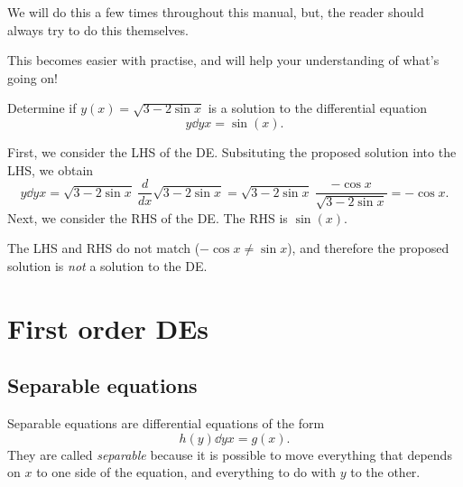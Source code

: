 \documentclass{book}
\begin{document}
We will do this a few times throughout this manual, but, the reader
should always try to do this themselves.

This becomes easier with practise, and will help your understanding of
what's going on!

\begin{example*}
  Determine if $y(x) = \sqrt{3-2\sin x}$ is a solution to the
  differential equation
  \begin{dmath*}
    y \dd{y}{x} = \sin(x).
  \end{dmath*}
\end{example*}

\begin{solution}
  First, we consider the LHS of the DE.  Subsituting the proposed
  solution into the LHS, we obtain
  \begin{dmath*}
    y \dd{y}{x} = \sqrt{3-2\sin x}\ \frac{d}{dx} \sqrt{3-2\sin x}
                = \sqrt{3-2\sin x}\ \frac{-\cos x}{\sqrt{3-2\sin x}}
                = - \cos x.
  \end{dmath*}
  Next, we consider the RHS of the DE.  The RHS is $\sin(x)$.

  The LHS and RHS do not match ($-\cos x \neq \sin x$), and therefore
  the proposed solution is \emph{not} a solution to the DE.
\end{solution}


\newpage
\chapter{First order DEs}



\newpage
\section{Separable equations}

Separable equations are differential equations of the form
\begin{equation}
  \label{eq:separable}
  h(y) \dd{y}{x} = g(x).
\end{equation}
They are called \emph{separable} because it is possible to move
everything that depends on $x$ to one side of the equation, and
everything to do with $y$ to the other.
\end{document}
